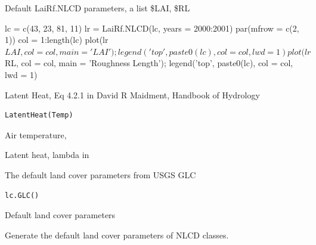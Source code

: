 \documentclass[a4paper]{book}
\begin{document}
%
\begin{Value}
Default LaiRf.NLCD parameters, a list \$LAI, \$RL
\end{Value}
%
\begin{Examples}
\begin{ExampleCode}
lc = c(43, 23, 81, 11)
lr = LaiRf.NLCD(lc, years = 2000:2001)
par(mfrow = c(2, 1))
col = 1:length(lc)
plot(lr$LAI, col = col, main = 'LAI');
legend('top', paste0(lc), col = col, lwd = 1)
plot(lr$RL, col = col, main = 'Roughness Length');
legend('top', paste0(lc), col = col, lwd = 1)
\end{ExampleCode}
\end{Examples}
%
\begin{Description}\relax
Latent Heat, Eq 4.2.1 in David R Maidment, Handbook of Hydrology
\end{Description}
%
\begin{Usage}
\begin{verbatim}
LatentHeat(Temp)
\end{verbatim}
\end{Usage}
%
\begin{Arguments}
\begin{ldescription}
\item[\code{Temp}] Air temperature, 
\end{ldescription}
\end{Arguments}
%
\begin{Value}
Latent heat, lambda in 
\end{Value}
%
\begin{Description}\relax
The default land cover parameters from USGS GLC
\end{Description}
%
\begin{Usage}
\begin{verbatim}
lc.GLC()
\end{verbatim}
\end{Usage}
%
\begin{Value}
Default land cover parameters
\end{Value}
%
\begin{Description}\relax
Generate the default land cover parameters of NLCD classes.
\end{Description}
\end{document}
